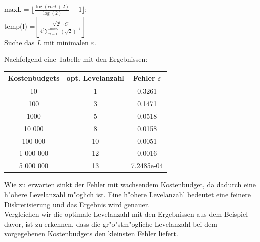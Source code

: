 \begin{algorithm}[H]
$\text{maxL}= \lfloor\frac{\log( cost + 2)}{\log(2)} -1\rfloor;$\\
temp(l) =$\left\lfloor \frac{\sqrt{2^l}\cdot C}{4^l\sum_{l=1}^{maxL}(\sqrt{2})^{-l}}\right\rfloor$ 
\\
Suche das $L$ mit minimalen $\varepsilon$.\\[0,5cm]


\caption{Algorithmus f"ur optimale Sample-und Levelanzahl mit der Lagrange-Methode}
\end{algorithm}\vspace{0,3cm}
Nachfolgend eine Tabelle mit den Ergebnissen:\\
\begin{center}
\begin{tabular}{|c|c|c|}
Kostenbudgets & opt. Levelanzahl & Fehler $\varepsilon$ \\
 \hline
10 & 1 & 0.3261 \\
\hline
100& 3 & 0.1471 \\
\hline
1000& 5 &  0.0518 \\
\hline
10 000& 8 & 0.0158 \\
\hline
100 000& 10 & 0.0051 \\
\hline
1 000 000& 12 &  0.0016 \\
\hline
5 000 000& 13 & 7.2485e-04
 \\
\end{tabular}
\end{center}\vspace{0,2cm}
Wie zu erwarten sinkt der Fehler mit wachsendem Kostenbudget, da dadurch eine h"ohere Levelanzahl m"oglich ist. Eine h"ohere Levelanzahl bedeutet eine feinere Diskretisierung und das Ergebnis wird genauer.\\
Vergleichen wir die optimale Levelanzahl mit den Ergebnissen aus dem Beispiel davor, ist zu erkennen, dass die gr"o"stm"ogliche Levelanzahl bei dem vorgegebenen Kostenbudgets den kleinsten Fehler liefert.  

